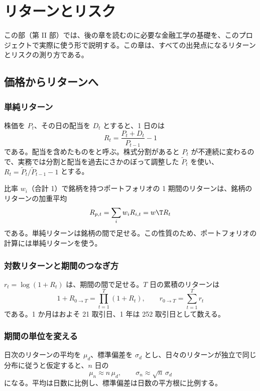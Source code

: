 \chapter{リターンとリスク}\label{ch:ret}

この部（第 II 部）では、後の章を読むのに必要な金融工学の基礎を、このプロジェクトで実際に使う形で説明する。この章は、すべての出発点になるリターンとリスクの測り方である。

\section{価格からリターンへ}

\subsection{単純リターン}

株価を $P_t$、その日の配当を $D_t$ とすると、1 日のは
\begin{equation}
R_t = \frac{P_t + D_t}{P_{t-1}} - 1
\end{equation}
である。配当を含めたものをと呼ぶ。株式分割があると $P_t$ が不連続に変わるので、実務では分割と配当を過去にさかのぼって調整した $\tilde P_t$ を使い、$R_t = \tilde P_t / \tilde P_{t-1} - 1$ とする。

\begin{defbox}[定義：ポートフォリオのリターン]
比率 $w_i$（合計 1）で銘柄を持つポートフォリオの 1 期間のリターンは、銘柄のリターンの加重平均
\[ R_{p,t} = \sum_i w_i R_{i,t} = w\T R_t \]
である。単純リターンは銘柄の間で足せる。この性質のため、ポートフォリオの計算には単純リターンを使う。
\end{defbox}

\subsection{対数リターンと期間のつなぎ方}

 $r_t = \log(1+R_t)$ は、期間の間で足せる。$T$ 日の累積のリターンは
\[ 1 + R_{0\to T} = \prod_{t=1}^{T}(1+R_t), \qquad r_{0\to T} = \sum_{t=1}^{T} r_t \]
である。1 か月はおよそ 21 取引日、1 年は 252 取引日として数える。

\subsection{期間の単位を変える}

日次のリターンの平均を $\mu_d$、標準偏差を $\sigma_d$ とし、日々のリターンが独立で同じ分布に従うと仮定すると、$n$ 日の
\begin{equation}
\mu_n \approx n\,\mu_d, \qquad \sigma_n \approx \sqrt{n}\,\sigma_d
\label{eq:sqrt-time}
\end{equation}
になる。平均は日数に比例し、標準偏差は日数の平方根に比例する。

